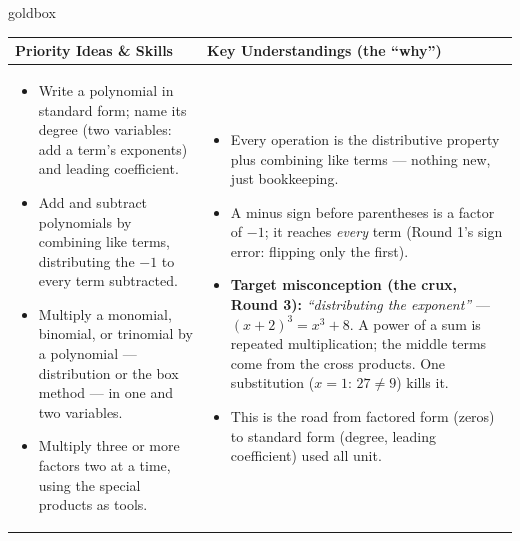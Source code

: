 \documentclass[10pt]{article}
\begin{document}
\renewcommand{\arraystretch}{1.4}
\begin{skillbox}{goldbox}
\begin{tabularx}{\linewidth}{@{}X|X@{}}
\textbf{Priority Ideas \& Skills} & \textbf{Key Understandings (the ``why'')} \\[2pt]
\hline
\vspace{-6pt}
\begin{itemize}[leftmargin=1.1em, nosep, after=\vspace{2pt}]
  \item Write a polynomial in standard form; name its degree (two variables: add a term's
        exponents) and leading coefficient.
  \item Add and subtract polynomials by combining like terms, distributing the $-1$ to every
        term subtracted.
  \item Multiply a monomial, binomial, or trinomial by a polynomial --- distribution or the box
        method --- in one and two variables.
  \item Multiply three or more factors two at a time, using the special products as tools.
\end{itemize}
&
\vspace{-6pt}
\begin{itemize}[leftmargin=1.1em, nosep, after=\vspace{2pt}]
  \item Every operation is the distributive property plus combining like terms --- nothing new,
        just bookkeeping.
  \item A minus sign before parentheses is a factor of $-1$; it reaches \emph{every} term
        (Round 1's sign error: flipping only the first).
  \item \textbf{Target misconception (the crux, Round 3):} \emph{``distributing the
        exponent''} --- $(x+2)^3=x^3+8$. A power of a sum is repeated multiplication; the
        middle terms come from the cross products. One substitution ($x=1$: $27\ne9$) kills it.
  \item This is the road from factored form (zeros) to standard form (degree, leading
        coefficient) used all unit.
\end{itemize}
\end{tabularx}
\end{skillbox}
\end{document}
